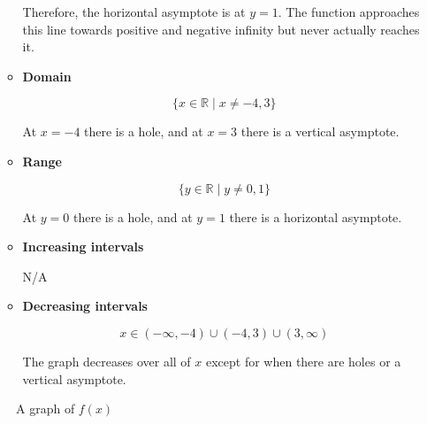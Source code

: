 \documentclass[12pt]{article}
\begin{document}
\begin{itemize}
\begin{itemize}
        Therefore, the horizontal asymptote is at $y = 1$. The function approaches this line towards positive and negative infinity but never actually reaches it.

        \item \textbf{Domain}

        \[ \{ x \in \mathbb{R} \mid x \neq -4, 3 \} \]

        At $x = -4$ there is a hole, and at $x = 3$ there is a vertical asymptote.

        \item \textbf{Range}

        \[ \{ y \in \mathbb{R} \mid y \neq 0, 1 \} \]

        At $y = 0$ there is a hole, and at $y = 1$ there is a horizontal asymptote.

        \item \textbf{Increasing intervals}

        N/A

        \item \textbf{Decreasing intervals}

        \[ x \in (-\infty, -4) \cup (-4, 3) \cup (3, \infty) \]

        The graph decreases over all of $x$ except for when there are holes or a vertical asymptote.
    \end{itemize}
\end{itemize}

\begin{figure}[H]
    \begin{center}
        \caption[Figure 26]{A graph of $f(x)$}
        \label{fig:functionproperties}
    \end{center}
\end{figure}
\end{document}
